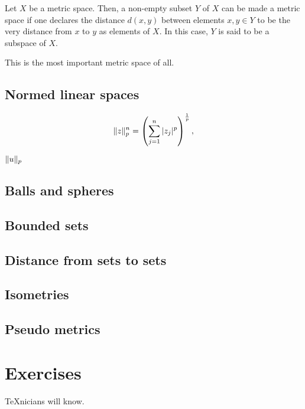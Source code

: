 \begin{example}[Subspaces]\label{example:subspaces}
  Let \(X\) be a metric space. Then, a non-empty subset \(Y\) of \(X\) can be
  made a metric space if one declares the distance \(d(x,y)\) between elements
  \(x,y\in{Y}\) to be the very distance from \(x\) to \(y\) as elements of
  \(X\). In this case, \(Y\) is said to be a subspace of \(X\).
\end{example}

\begin{example}\label{example:the-real-line}
  This is the most important metric space of all.
\end{example}

\subsection{Normed linear spaces}

\[
  \norm<n>(p)[z]=\left(\sum_{j=1}^{n}\,\abs{z_{j}}^{p}\right)^{\frac{1}{p}},
\]

\begin{example}[\(p\)-norm]\label{example:p-norm}
  \(\norm(p)[u]\)
\end{example}

\subsection{Balls and spheres}

\subsection{Bounded sets}

\subsection{Distance from sets to sets}

\subsection{Isometries}

\subsection{Pseudo metrics}

\section{Exercises}

\begin{exercise}
  \TeX{}nicians will know.
\end{exercise}
